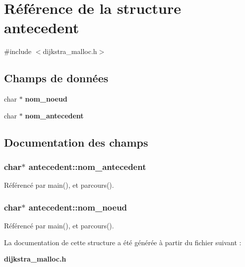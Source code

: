 \section{Référence de la structure antecedent}
\label{structantecedent}


{\ttfamily \#include $<$dijkstra\+\_\+malloc.\+h$>$}

\subsection*{Champs de données}
\begin{DoxyCompactItemize}
\item 
char $\ast$ {\bf nom\+\_\+noeud}
\item 
char $\ast$ {\bf nom\+\_\+antecedent}
\end{DoxyCompactItemize}


\subsection{Documentation des champs}
\subsubsection[{nom\+\_\+antecedent}]{\setlength{\rightskip}{0pt plus 5cm}char$\ast$ antecedent\+::nom\+\_\+antecedent}\label{structantecedent_ad92aa36236359f06408b0570cbb175f7}


Référencé par main(), et parcours().

\subsubsection[{nom\+\_\+noeud}]{\setlength{\rightskip}{0pt plus 5cm}char$\ast$ antecedent\+::nom\+\_\+noeud}\label{structantecedent_a252cd5b8b3a293c6f66270359012db0a}


Référencé par main(), et parcours().



La documentation de cette structure a été générée à partir du fichier suivant \+:\begin{DoxyCompactItemize}
\item 
{\bf dijkstra\+\_\+malloc.\+h}\end{DoxyCompactItemize}
